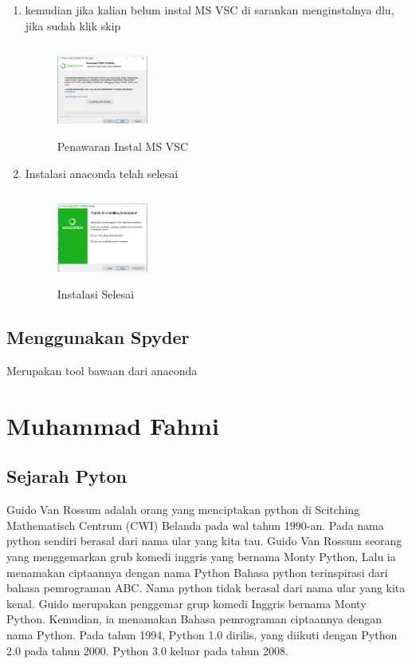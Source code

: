 \begin{enumerate}
    \item kemudian jika kalian belum instal MS VSC di sarankan menginstalnya dlu, jika sudah klik skip
    \begin{figure}[!htbp]
        \centering
        \includegraphics[width=3cm,height=3cm]{figures/sembilan.png}
        \caption{Penawaran Instal MS VSC}
        \label{offering}
        \end{figure}

    \item Instalasi anaconda telah selesai
    \begin{figure}[!htbp]
        \centering
        \includegraphics[width=3cm,height=3cm]{figures/sepuluh.png}
        \caption{Instalasi Selesai}
        \label{akhir}
        \end{figure}
\end{enumerate}
\subsection{Menggunakan Spyder}
Merupakan tool bawaan dari anaconda


\section{Muhammad Fahmi}

\subsection{Sejarah Pyton}
Guido Van Rossum adalah orang yang menciptakan python di Scitching Mathematisch Centrum (CWI) Belanda pada wal tahun 1990-an.
Pada nama python sendiri berasal dari nama ular yang kita tau. Guido Van Rossum seorang yang menggemarkan grub komedi inggris yang bernama Monty Python, Lalu ia menamakan ciptaannya dengan nama Python
Bahasa python terinspirasi dari bahasa pemrograman ABC. Nama python tidak berasal dari nama ular yang kita kenal. Guido merupakan penggemar grup komedi Inggris bernama Monty Python. Kemudian, ia menamakan Bahasa pemrograman ciptaannya dengan nama Python.
Pada tahun 1994, Python 1.0 dirilis, yang diikuti dengan Python 2.0 pada tahun 2000. Python 3.0 keluar pada tahun 2008.

